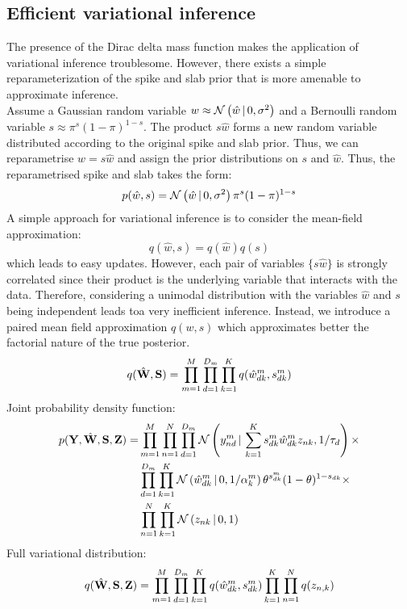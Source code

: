 \documentclass[10pt, a4paper,openany]{report}
\begin{document}
\subsection{Efficient variational inference}
The presence of the Dirac delta mass function makes the application of variational inference troublesome. However, there exists a simple reparameterization of the spike and slab prior that is more amenable to approximate inference.\\
Assume a Gaussian random variable $w \approx \mathcal{N}\left(\hat{w} \,|\, 0,\sigma^2\right)$ and a Bernoulli random variable $s \approx \pi^{s}(1-\pi)^{1-s}$. The product $s\hat{w}$ forms a new random variable distributed according to the original spike and slab prior. Thus, we can reparametrise $w=s\hat{w}$ and assign the prior distributions on $s$ and $\hat{w}$. Thus, the reparametrised spike and slab takes the form:
\[
p(\hat{w},s) = \mathcal{N}\left(\hat{w} \,|\, 0,\sigma^2\right) \pi^{s}(1-\pi)^{1-s}
\]
A simple approach for variational inference is to consider the mean-field approximation:
\[
q(\hat{w},s) = q(\hat{w})q(s)
\]
which leads to easy updates. However, each pair of variables $\{s\hat{w}\}$ is strongly correlated since their product is the underlying variable that interacts with the data. Therefore, considering a unimodal distribution with the variables $\hat{w}$ and $s$ being independent leads toa  very inefficient inference. Instead, we introduce a paired mean field approximation $q(w,s)$ which approximates better the factorial nature of the true posterior.
\[
q(\hat{{\bf W}},{\bf S}) = \prod_{m=1}^{M} \prod_{d=1}^{D_m} \prod_{k=1}^{K} q(\hat{w}_{dk}^m,s_{dk}^m)
\]
Joint probability density function:
\begin{align*}
p({\bf Y},\hat{{\bf W}},{\bf S},{\bf Z}) = &\prod_{m=1}^{M} \prod_{n=1}^{N} \prod_{d=1}^{D_m} \mathcal{N}\left(y_{nd}^m \,|\, \sum_{k=1}^{K} s_{dk}^m \hat{w}_{dk}^m z_{nk},1/\tau_d\right) \times \\
&\prod_{d=1}^{D_m}\prod_{k=1}^{K} \mathcal{N}\left(\hat{w}_{dk}^m \,|\, 0,1/\alpha_k^m\right) \theta^{s_{dk}^m}(1-\theta)^{1-s_{dk}} \times \\
&\prod_{n=1}^{N}\prod_{k=1}^{K} \mathcal{N}\left(z_{nk} \,|\, 0,1\right)
\end{align*}
Full variational distribution:
\[
q(\hat{{\bf W}},{\bf S},{\bf Z}) = \prod_{m=1}^{M} \prod_{d=1}^{D_m} \prod_{k=1}^{K} q(\hat{w}_{dk}^m,s_{dk}^m) \prod_{k=1}^{K}\prod_{n=1}^{N} q(z_{n,k})
\]
\end{document}
